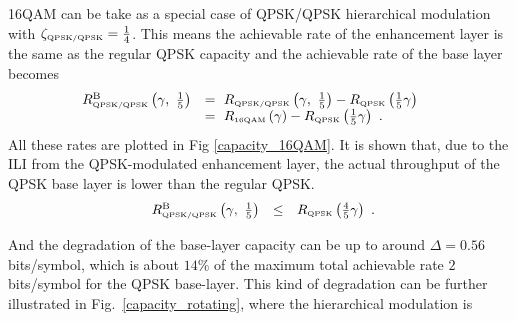 \documentclass[10pt,fleqn, twocolumn]{IEEEtran}
\begin{document}
16QAM can be take as a special case of QPSK/QPSK hierarchical
modulation with $\zeta_{\mbox{\tiny QPSK/QPSK}}=\frac{1}{4}$. This
means the achievable rate of the enhancement layer is the same as
the regular QPSK capacity and the achievable rate of the base
layer becomes
\begin{equation}\hspace{-0.2in}
\begin{array}{rl}
R_{\mbox{\tiny QPSK/QPSK}}^{\rm B}\left(\gamma,\
\frac{1}{5}\right)&=\ R_{\mbox{\tiny QPSK/QPSK}}\left(\gamma,\
\frac{1}{5}\right)-R_{\mbox{\tiny QPSK}} \left(\frac{1}{5}\gamma\right)\\
&=\ R_{\mbox{\tiny 16QAM}}\left(\gamma\right)-R_{\mbox{\tiny
QPSK}}\left(\frac{1}{5}\gamma\right)\ .
\end{array}\label{R_16QAM_B1}
\end{equation}
\noindent All these rates are plotted in Fig \ref{capacity_16QAM}.
It is shown that, due to the ILI from the QPSK-modulated
enhancement layer, the actual throughput of the QPSK base layer is
lower than the regular QPSK.
\begin{equation}
\begin{array}{rcl}
R_{\mbox{\tiny QPSK/QPSK}}^{\rm B}\left(\gamma,\ \frac{1}{5}
\right)&\leq&R_{\mbox{\tiny QPSK}} \left(\frac{4}{5}\gamma\right)
\end{array}.\label{R_16QAM_B2}
\end{equation}
\begin{figure}
\end{figure}
\noindent And the degradation of the base-layer capacity can be up
to around $\Delta=0.56$ bits/symbol, which is about $14\%$ of the
maximum total achievable rate $2$ bits/symbol for the QPSK
base-layer. This kind of degradation can be further illustrated in
Fig.~\ref{capacity_rotating}, where the hierarchical modulation is
\end{document}
